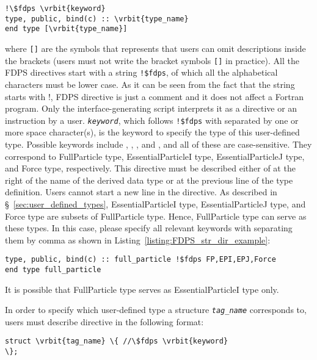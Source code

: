 \begin{screen}
\begin{Verbatim}[commandchars=\\\{\}]
!\$fdps \vrbit{keyword}
type, public, bind(c) :: \vrbit{type_name}
end type [\vrbit{type_name}]
\end{Verbatim}
\end{screen}
where \texttt{[]} are the symbols that represents that users can omit descriptions inside the brackets (users must not write the bracket symbols \texttt{[]} in practice). All the FDPS directives start with a string \verb|!$fdps|, of which all the alphabetical characters must be lower case. As it can be seen from the fact that the string starts with !, FDPS directive is just a comment and it does not affect a Fortran program. Only the interface-generating script interprets it as a directive or an instruction by a user. \textit{\texttt{keyword}}, which follows \verb|!$fdps| with separated by one or more space character(s), is the keyword to specify the type of this user-defined type. Possible keywords include , , , and , and all of these are case-sensitive. They correspond to FullParticle type, EssentialParticleI type, EssentialParticleJ type, and Force type, respectively. This directive must be described either of at the right of the name of the derived data type or at the previous line of the type definition. Users cannot start a new line in the directive. As described in \S~\ref{sec:user_defined_types}, EssentialParticleI type, EssentialParticleJ type, and Force type are subsets of FullParticle type. Hence, FullParticle type can serve as these types. In this case, please specify all relevant keywords with separating them by comma as shown in Listing~\ref{listing:FDPS_str_dir_example}:
\begin{lstlisting}[caption=An example of cases where FullParticle type serves as the others types,label=listing:FDPS_str_dir_example]
type, public, bind(c) :: full_particle !$fdps FP,EPI,EPJ,Force
end type full_particle
\end{lstlisting}
It is possible that FullParticle type serves as EssentialParticleI type only.

In order to specify which user-defined type a structure  \textit{\texttt{tag\_name}} corresponds to, users must describe directive in the following format:
\begin{screen}
\begin{Verbatim}[commandchars=\\\{\}]
struct \vrbit{tag_name} \{ //\$fdps \vrbit{keyword}
\};
\end{Verbatim}
\end{screen}

